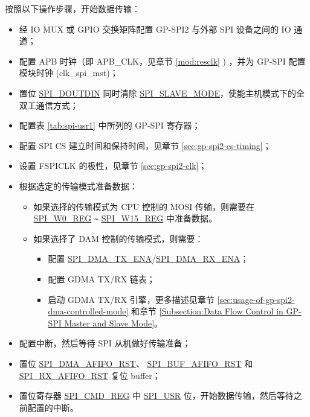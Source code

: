 \documentclass[main\_\_CN.tex]{subfiles}
\begin{document}
按照以下操作步骤，开始数据传输：
\begin{itemize}
    \item 经 IO MUX 或 GPIO 交换矩阵配置 GP-SPI2 与外部 SPI 设备之间的 IO 通道；
    \item 配置 APB 时钟（即 APB\_CLK，见章节  \ref{mod:resclk} \textit{}) ，并为 GP-SPI 配置模块时钟 (clk\_spi\_mst)；
    \item 置位  \hyperref[fielddesc:SPIDOUTDIN]{SPI\_DOUTDIN} 同时清除  \hyperref[fielddesc:SPISLAVEMODE]{SPI\_SLAVE\_MODE}，使能主机模式下的全双工通信方式；

    \item 配置表  \ref{tab:spi-usr1} 中所列的 GP-SPI 寄存器；

    \item 配置 SPI CS 建立时间和保持时间，见章节  \ref{sec:gp-spi2-cs-timing}；

    \item 设置 FSPICLK 的极性，见章节  \ref{sec:gp-spi2-clk}；

    \item 根据选定的传输模式准备数据：
    \begin{itemize}
        \item 如果选择的传输模式为 CPU 控制的 MOSI 传输，则需要在  \hyperref[regdesc:SPIW0REG]{SPI\_W0\_REG} \verb+~+ \hyperref[regdesc:SPIW15REG]{SPI\_W15\_REG} 中准备数据。

        \item 如果选择了 DAM 控制的传输模式，则需要：
        \begin{itemize}
            \item 配置  \hyperref[fielddesc:SPIDMATXENA]{SPI\_DMA\_TX\_ENA}/\hyperref[fielddesc:SPIDMARXENA]{SPI\_DMA\_RX\_ENA}；
            \item 配置 GDMA TX/RX 链表；
            \item 启动 GDMA TX/RX 引擎，更多描述见章节  \ref{sec:usage-of-gp-spi2-dma-controlled-mode} 和章节  \ref{Subsection:Data Flow Control in GP-SPI Master and Slave Mode}。
        \end{itemize}
    \end{itemize}

    \item 配置中断，然后等待 SPI 从机做好传输准备；

    \item 置位  \hyperref[fielddesc:SPIDMAAFIFORST]{SPI\_DMA\_AFIFO\_RST}、 \hyperref[fielddesc:SPIBUFAFIFORST]{SPI\_BUF\_AFIFO\_RST} 和  \hyperref[fielddesc:SPIRXAFIFORST]{SPI\_RX\_AFIFO\_RST} 复位 buffer；

    \item 置位寄存器  \hyperref[regdesc:SPICMDREG]{SPI\_CMD\_REG} 中  \hyperref[fielddesc:SPIUSR]{SPI\_USR} 位，开始数据传输，然后等待之前配置的中断。

\end{itemize}
\end{document}
